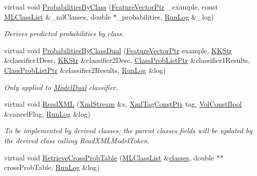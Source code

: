 \begin{DoxyCompactItemize}
\item 
virtual void \hyperlink{class_k_k_m_l_l_1_1_model_dual_ade44b69692248df468e4b10d1952ff3f}{Probabilities\+By\+Class} (\hyperlink{namespace_k_k_m_l_l_a0c5df3d48f45926fbc4fee04f5e3bc04}{Feature\+Vector\+Ptr} \+\_\+example, const \hyperlink{class_k_k_m_l_l_1_1_m_l_class_list}{M\+L\+Class\+List} \&\+\_\+ml\+Classes, double $\ast$\+\_\+probabilities, \hyperlink{class_k_k_b_1_1_run_log}{Run\+Log} \&\+\_\+log)
\begin{DoxyCompactList}\small\item\em Derives predicted probabilities by class. \end{DoxyCompactList}\item 
virtual void \hyperlink{class_k_k_m_l_l_1_1_model_dual_a0bec6bc89089c04f7b0eae2250d7570e}{Probabilities\+By\+Class\+Dual} (\hyperlink{namespace_k_k_m_l_l_a0c5df3d48f45926fbc4fee04f5e3bc04}{Feature\+Vector\+Ptr} example, \hyperlink{class_k_k_b_1_1_k_k_str}{K\+K\+Str} \&classifier1\+Desc, \hyperlink{class_k_k_b_1_1_k_k_str}{K\+K\+Str} \&classifier2\+Desc, \hyperlink{namespace_k_k_m_l_l_a60f96a524ddb189eff2b4391cf0b651c}{Class\+Prob\+List\+Ptr} \&classifier1\+Results, \hyperlink{namespace_k_k_m_l_l_a60f96a524ddb189eff2b4391cf0b651c}{Class\+Prob\+List\+Ptr} \&classifier2\+Results, \hyperlink{class_k_k_b_1_1_run_log}{Run\+Log} \&log)
\begin{DoxyCompactList}\small\item\em Only applied to \hyperlink{class_k_k_m_l_l_1_1_model_dual}{Model\+Dual} classifier. \end{DoxyCompactList}\item 
virtual void \hyperlink{class_k_k_m_l_l_1_1_model_dual_acd4989c89b05cea1d59eeea7e6b6a077}{Read\+X\+ML} (\hyperlink{class_k_k_b_1_1_xml_stream}{Xml\+Stream} \&s, \hyperlink{namespace_k_k_b_a5f1b0b1667d79fec26deeff10c43df23}{Xml\+Tag\+Const\+Ptr} tag, \hyperlink{namespace_k_k_b_a7d390f568e2831fb76b86b56c87bf92f}{Vol\+Const\+Bool} \&cancel\+Flag, \hyperlink{class_k_k_b_1_1_run_log}{Run\+Log} \&log)
\begin{DoxyCompactList}\small\item\em To be implemented by derived classes; the parent classes fields will be updated by the derived class calling Read\+X\+M\+L\+Model\+Token. \end{DoxyCompactList}\item 
virtual void \hyperlink{class_k_k_m_l_l_1_1_model_dual_aef8305bf0dad2053413aaa370c4d1986}{Retrieve\+Cross\+Prob\+Table} (\hyperlink{class_k_k_m_l_l_1_1_m_l_class_list}{M\+L\+Class\+List} \&\hyperlink{class_k_k_m_l_l_1_1_model_a764e7680f07814c3c5313dc4e4de60a1}{classes}, double $\ast$$\ast$cross\+Prob\+Table, \hyperlink{class_k_k_b_1_1_run_log}{Run\+Log} \&log)
$$
\end{DoxyCompactItemize}
